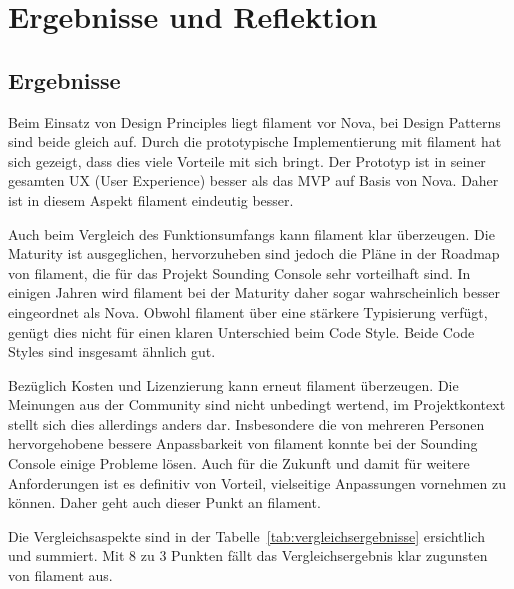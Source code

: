 
\newpage


\section{Ergebnisse und Reflektion}

\subsection{Ergebnisse}
Beim Einsatz von Design Principles liegt filament vor Nova, bei Design Patterns sind beide gleich auf.
Durch die prototypische Implementierung mit filament hat sich gezeigt, dass dies viele Vorteile mit sich bringt.
Der Prototyp ist in seiner gesamten UX (User Experience) besser als das MVP auf Basis von Nova.
Daher ist in diesem Aspekt filament eindeutig besser.

Auch beim Vergleich des Funktionsumfangs kann filament klar überzeugen.
Die Maturity ist ausgeglichen, hervorzuheben sind jedoch die Pläne in der Roadmap von filament, die für das Projekt Sounding Console sehr vorteilhaft sind.
In einigen Jahren wird filament bei der Maturity daher sogar wahrscheinlich besser eingeordnet als Nova.
Obwohl filament über eine stärkere Typisierung verfügt, genügt dies nicht für einen klaren Unterschied beim Code Style.
Beide Code Styles sind insgesamt ähnlich gut.

Bezüglich Kosten und Lizenzierung kann erneut filament überzeugen.
Die Meinungen aus der Community sind nicht unbedingt wertend, im Projektkontext stellt sich dies allerdings anders dar.
Insbesondere die von mehreren Personen hervorgehobene bessere Anpassbarkeit von filament konnte bei der Sounding Console einige Probleme lösen.
Auch für die Zukunft und damit für weitere Anforderungen ist es definitiv von Vorteil, vielseitige Anpassungen vornehmen zu können.
Daher geht auch dieser Punkt an filament.

Die Vergleichsaspekte sind in der Tabelle~\ref{tab:vergleichsergebnisse} ersichtlich und summiert.
Mit 8 zu 3 Punkten fällt das Vergleichsergebnis klar zugunsten von filament aus.


